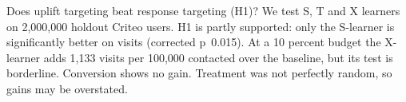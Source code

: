Does uplift targeting beat response targeting (H1)? We test S, T and X learners on 2,000,000 holdout Criteo users. H1 is partly supported: only the \mbox{S-learner} is significantly better on visits (corrected p~0.015). At a 10 percent budget the \mbox{X-learner} adds 1,133 visits per 100,000 contacted over the baseline, but its test is borderline. Conversion shows no gain. Treatment was not perfectly random, so gains may be overstated.
